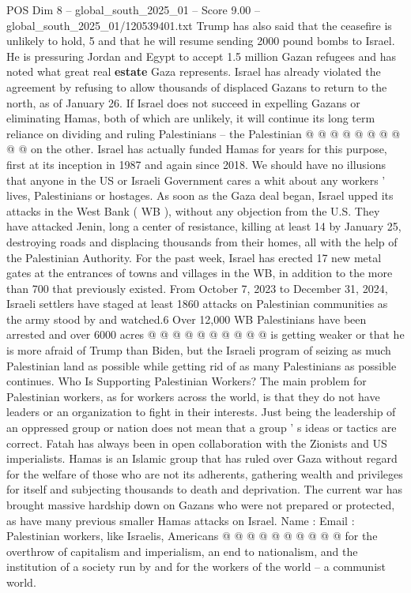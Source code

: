 \begin{textsample}{POS Dim 8 – global\_south\_2025\_01 – Score 9.00 – global\_south\_2025\_01/120539401.txt}
Trump has also said that the ceasefire is unlikely to hold, 5 and that he will resume sending 2000 pound bombs to Israel.
He is pressuring Jordan and Egypt to accept 1.5 million Gazan refugees and has noted what great real \textbf{estate} Gaza represents.
Israel has already violated the agreement by refusing to allow thousands of displaced Gazans to return to the north, as of January 26.
If Israel does not succeed in expelling Gazans or eliminating Hamas, both of which are unlikely, it will continue its long term reliance on dividing and ruling Palestinians -- the Palestinian @ @ @ @ @ @ @ @ @ @ on the other.
Israel has actually funded Hamas for years for this purpose, first at its inception in 1987 and again since 2018.
We should have no illusions that anyone in the US or Israeli Government cares a whit about any workers ' lives, Palestinians or hostages.
As soon as the Gaza deal began, Israel upped its attacks in the West Bank ( WB ), without any objection from the U.S.
They have attacked Jenin, long a center of resistance, killing at least 14 by January 25, destroying roads and displacing thousands from their homes, all with the help of the Palestinian Authority.
For the past week, Israel has erected 17 new metal gates at the entrances of towns and villages in the WB, in addition to the more than 700 that previously existed.
From October 7, 2023 to December 31, 2024, Israeli settlers have staged at least 1860 attacks on Palestinian communities as the army stood by and watched.6 Over 12,000 WB Palestinians have been arrested and over 6000 acres @ @ @ @ @ @ @ @ @ @ is getting weaker or that he is more afraid of Trump than Biden, but the Israeli program of seizing as much Palestinian land as possible while getting rid of as many Palestinians as possible continues.
Who Is Supporting Palestinian Workers?
The main problem for Palestinian workers, as for workers across the world, is that they do not have leaders or an organization to fight in their interests.
Just being the leadership of an oppressed group or nation does not mean that a group ' s ideas or tactics are correct.
Fatah has always been in open collaboration with the Zionists and US imperialists.
Hamas is an Islamic group that has ruled over Gaza without regard for the welfare of those who are not its adherents, gathering wealth and privileges for itself and subjecting thousands to death and deprivation.
The current war has brought massive hardship down on Gazans who were not prepared or protected, as have many previous smaller Hamas attacks on Israel.
Name : Email : Palestinian workers, like Israelis, Americans @ @ @ @ @ @ @ @ @ @ for the overthrow of capitalism and imperialism, an end to nationalism, and the institution of a society run by and for the workers of the world -- a communist world.

\end{textsample}
